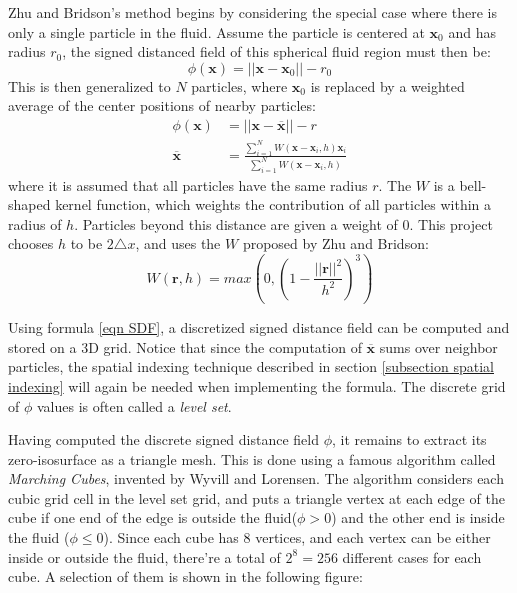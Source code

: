 Zhu and Bridson's method\cite{zhu2005animating} begins by considering the special case where there is only a single particle in the fluid. Assume the particle is centered at $\textbf{x}_0$ and has radius $r_0$, the signed distanced field of this spherical fluid region must then be:
$$
\phi(\textbf{x}) = ||\textbf{x}-\textbf{x}_0|| - r_0
$$
This is then generalized to $N$ particles, where $\textbf{x}_0$ is replaced by a weighted average of the center positions of nearby particles:
\begin{equation}
    \label{eqn SDF}
    \begin{aligned}
        \phi(\textbf{x}) &= ||\textbf{x}-\overline{\textbf{x}}|| - r \\
        \overline{\textbf{x}}&= \frac{\sum_{i=1}^{N} W(\textbf{x}-\textbf{x}_i,h)\textbf{x}_i}{\sum_{i=1}^{N} W(\textbf{x}-\textbf{x}_i,h)}
    \end{aligned}
\end{equation}
where it is assumed that all particles have the same radius $r$. The $W$ is a bell-shaped kernel function, which weights the contribution of all particles within a radius of $h$. Particles beyond this distance are given a weight of $0$. This project chooses $h$ to be $2\triangle x$, and uses the $W$ proposed by Zhu and Bridson:
$$
W(\textbf{r},h) = max(0,(1-\frac{||\textbf{r}||^2}{h^2})^3) 
$$
\begin{figure}[H]
    \centering
      
      
\end{figure}
Using formula \ref{eqn SDF}, a discretized signed distance field can be computed and stored on a 3D grid. Notice that since the computation of $\overline{\textbf{x}}$ sums over neighbor particles, the spatial indexing technique described in section \ref{subsection spatial indexing} will again be needed when implementing the formula. The discrete grid of $\phi$ values is often called a \textit{level set}\cite{bridson2015fluid}.


Having computed the discrete signed distance field $\phi$, it remains to extract its zero-isosurface as a triangle mesh. This is done using a famous algorithm called \textit{Marching Cubes}, invented by Wyvill\cite{wyvill1986soft} and Lorensen\cite{lorensen1987marching}. The algorithm considers each cubic grid cell in the level set grid, and puts a triangle vertex at each edge of the cube if one end of the edge is outside the fluid($\phi>0$) and the other end is inside the fluid ($\phi\leq 0$). Since each cube has 8 vertices, and each vertex can be either inside or outside the fluid, there're a total of $2^8=256$ different cases for each cube. A selection of them is shown in the following figure:

